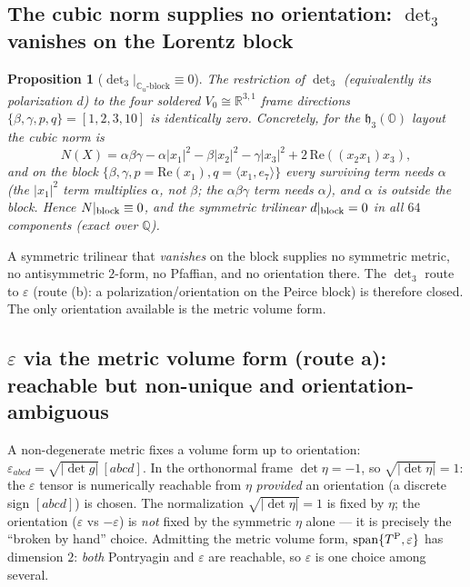 \documentclass[11pt]{article}
\newcommand{\R}{\mathbb{R}}
\newcommand{\Q}{\mathbb{Q}}
\newcommand{\OO}{\mathbb{O}}
\newcommand{\hh}{\mathfrak{h}}
\theoremstyle{definition}\newtheorem{remark}{Remark}
\theoremstyle{definition}\newtheorem{definition}{Definition}
\theoremstyle{plain}\newtheorem{proposition}{Proposition}
\theoremstyle{plain}\newtheorem{lemma}{Lemma}
\begin{document}
\subsection{The cubic norm supplies no orientation: $\det_3$ vanishes on the Lorentz block}
\begin{proposition}[$\det\nolimits_3|_{\mathbb{C}_u\text{-block}}\equiv0$]\label{prop:det3}
The restriction of $\det\nolimits_3$ (equivalently its polarization $d$) to the four
soldered $V_0\cong\R^{3,1}$ frame directions $\{\beta,\gamma,p,q\}=[1,2,3,10]$ is
identically zero. Concretely, for the $\hh_3(\OO)$ layout the cubic norm is
\begin{equation}
  N(X)=\alpha\beta\gamma-\alpha|x_1|^2-\beta|x_2|^2-\gamma|x_3|^2+2\,\mathrm{Re}((x_2x_1)x_3),
\end{equation}
and on the block $\{\beta,\gamma,p=\mathrm{Re}(x_1),q=\langle x_1,e_7\rangle\}$ every
surviving term needs $\alpha$ (the $|x_1|^2$ term multiplies $\alpha$, not $\beta$;
the $\alpha\beta\gamma$ term needs $\alpha$), and $\alpha$ is \emph{outside} the
block. Hence $N|_{\rm block}\equiv0$, and the symmetric trilinear $d|_{\rm block}=0$
in all $64$ components (exact over $\Q$).
\end{proposition}
A symmetric trilinear that \emph{vanishes} on the block supplies no symmetric metric,
no antisymmetric $2$-form, no Pfaffian, and no orientation there. The $\det\nolimits_3$
route to $\varepsilon$ (route (b): a polarization/orientation on the Peirce block) is
therefore closed. The only orientation available is the metric volume form.

\subsection{$\varepsilon$ via the metric volume form (route a): reachable but non-unique and orientation-ambiguous}
A non-degenerate metric fixes a volume form up to orientation:
$\varepsilon_{abcd}=\sqrt{|\det g|}\,[abcd]$. In the orthonormal frame
$\det\eta=-1$, so $\sqrt{|\det\eta|}=1$: the $\varepsilon$ tensor is numerically
reachable from $\eta$ \emph{provided} an orientation (a discrete sign $[abcd]$) is
chosen. The normalization $\sqrt{|\det\eta|}=1$ is fixed by $\eta$; the orientation
($\varepsilon$ vs $-\varepsilon$) is \emph{not} fixed by the symmetric $\eta$ alone
--- it is precisely the ``broken by hand'' choice. Admitting the metric volume form,
$\mathrm{span}\{T^{\rm P},\varepsilon\}$ has dimension $2$: \emph{both} Pontryagin and
$\varepsilon$ are reachable, so $\varepsilon$ is one choice among several.
\end{document}
